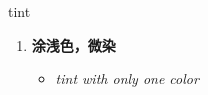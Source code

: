
\begin{frame}
{\huge tint}
\begin{center}
\begin{enumerate}\Large
  \item \textbf{涂浅色，微染}
  \begin{itemize}
    \item \em{\Large{tint with only one color}}
  \end{itemize}
\end{enumerate}
\end{center}
\end{frame}
